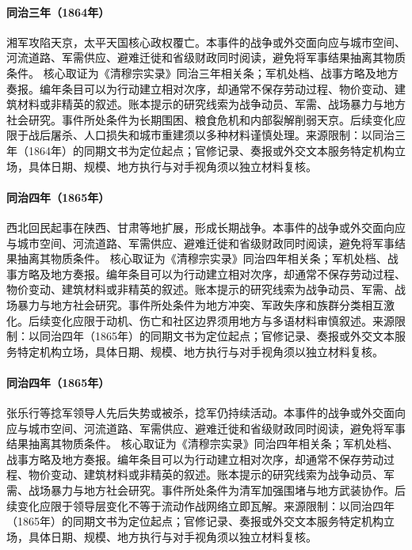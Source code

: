 \hypertarget{civic:EQ-1864-TIANJING-FALL}{}\paragraph{同治三年（1864年）}湘军攻陷天京，太平天国核心政权覆亡。本事件的战争或外交面向应与城市空间、河流道路、军需供应、避难迁徙和省级财政同时阅读，避免将军事结果抽离其物质条件。 核心取证为《清穆宗实录》同治三年相关条；军机处档、战事方略及地方奏报。编年条目可以为行动建立相对次序，却通常不保存劳动过程、物价变动、建筑材料或非精英的叙述。账本提示的研究线索为战争动员、军需、战场暴力与地方社会研究。事件所处条件为长期围困、粮食危机和内部裂解削弱天京。后续变化应限于战后屠杀、人口损失和城市重建须以多种材料谨慎处理。来源限制：以同治三年（1864年）的同期文书为定位起点；官修记录、奏报或外交文本服务特定机构立场，具体日期、规模、地方执行与对手视角须以独立材料复核。
\hypertarget{civic:EQ-1865-DUNGAN-REVOLT}{}\paragraph{同治四年（1865年）}西北回民起事在陕西、甘肃等地扩展，形成长期战争。本事件的战争或外交面向应与城市空间、河流道路、军需供应、避难迁徙和省级财政同时阅读，避免将军事结果抽离其物质条件。 核心取证为《清穆宗实录》同治四年相关条；军机处档、战事方略及地方奏报。编年条目可以为行动建立相对次序，却通常不保存劳动过程、物价变动、建筑材料或非精英的叙述。账本提示的研究线索为战争动员、军需、战场暴力与地方社会研究。事件所处条件为地方冲突、军政失序和族群分类相互激化。后续变化应限于动机、伤亡和社区边界须用地方与多语材料审慎叙述。来源限制：以同治四年（1865年）的同期文书为定位起点；官修记录、奏报或外交文本服务特定机构立场，具体日期、规模、地方执行与对手视角须以独立材料复核。
\hypertarget{civic:EQ-1865-NIAN-LEADER-DEATH}{}\paragraph{同治四年（1865年）}张乐行等捻军领导人先后失势或被杀，捻军仍持续活动。本事件的战争或外交面向应与城市空间、河流道路、军需供应、避难迁徙和省级财政同时阅读，避免将军事结果抽离其物质条件。 核心取证为《清穆宗实录》同治四年相关条；军机处档、战事方略及地方奏报。编年条目可以为行动建立相对次序，却通常不保存劳动过程、物价变动、建筑材料或非精英的叙述。账本提示的研究线索为战争动员、军需、战场暴力与地方社会研究。事件所处条件为清军加强围堵与地方武装协作。后续变化应限于领导层变化不等于流动作战网络立即瓦解。来源限制：以同治四年（1865年）的同期文书为定位起点；官修记录、奏报或外交文本服务特定机构立场，具体日期、规模、地方执行与对手视角须以独立材料复核。
